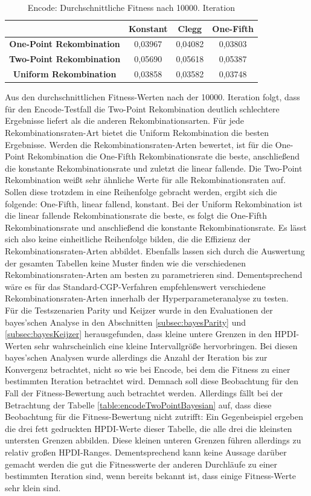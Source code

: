 \begin{table}[H]
	\centering
	\begin{tabular} {c | c | c | c}
		& \textbf{Konstant} & \textbf{Clegg} & \textbf{One-Fifth} \\
		\hline
		\textbf{One-Point Rekombination} & 0,03967 & 0,04082 & 0,03803\\
		\hline
		\textbf{Two-Point Rekombination} & 0,05690 & 0,05618 & 0,05387\\
		\hline
		\textbf{Uniform Rekombination} & 0,03858 & 0,03582 & 0,03748\\
	\end{tabular}
	\caption{Encode: Durchschnittliche Fitness nach 10000. Iteration}
	\label{table:encodeMW}
\end{table}

Aus den durchschnittlichen Fitness-Werten nach der 10000. Iteration folgt, dass für den Encode-Testfall die Two-Point Rekombination deutlich schlechtere Ergebnisse liefert als die anderen Rekombinationsarten.
Für jede Rekombinationsraten-Art bietet die Uniform Rekombination die besten Ergebnisse.
Werden die Rekombinationsraten-Arten bewertet, ist für die One-Point Rekombination die One-Fifth Rekombinationsrate die beste, anschließend die konstante Rekombinationsrate und zuletzt die linear fallende.
Die Two-Point Rekombination weißt sehr ähnliche Werte für alle Rekombinationsraten auf.
Sollen diese trotzdem in eine Reihenfolge gebracht werden, ergibt sich die folgende: One-Fifth, linear fallend, konstant.
Bei der Uniform Rekombination ist die linear fallende Rekombinationsrate die beste, es folgt die One-Fifth Rekombinationsrate und anschließend die konstante Rekombinationsrate.
Es lässt sich also keine einheitliche Reihenfolge bilden, die die Effizienz der Rekombinationsraten-Arten abbildet.
Ebenfalls lassen sich durch die Auswertung der gesamten Tabellen keine Muster finden wie die verschiedenen Rekombinationsraten-Arten am besten zu parametrieren sind.
Dementsprechend wäre es für das Standard-CGP-Verfahren empfehlenswert verschiedene Rekombinationsraten-Arten innerhalb der Hyperparameteranalyse zu testen.\\
Für die Testszenarien Parity und Keijzer wurde in den Evaluationen der bayes'schen Analyse in den Abschnitten \ref{subsec:bayesParity} und \ref{subsec:bayesKeijzer} herausgefunden, dass kleine untere Grenzen in den HPDI-Werten sehr wahrscheinlich eine kleine Intervallgröße hervorbringen.
Bei diesen bayes'schen Analysen wurde allerdings die Anzahl der Iteration bis zur Konvergenz betrachtet, nicht so wie bei Encode, bei dem die Fitness zu einer bestimmten Iteration betrachtet wird.
Demnach soll diese Beobachtung für den Fall der Fitness-Bewertung auch betrachtet werden.
Allerdings fällt bei der Betrachtung der Tabelle \ref{table:encodeTwoPointBayesian} auf, dass diese Beobachtung für die Fitness-Bewertung nicht zutrifft:
Ein Gegenbeispiel ergeben die drei fett gedruckten HPDI-Werte dieser Tabelle, die alle drei die kleinsten untersten Grenzen abbilden.
Diese kleinen unteren Grenzen führen allerdings zu relativ großen HPDI-Ranges.
Dementsprechend kann keine Aussage darüber gemacht werden die gut die Fitnesswerte der anderen Durchläufe zu einer bestimmten Iteration sind, wenn bereits bekannt ist, dass einige Fitness-Werte sehr klein sind.


